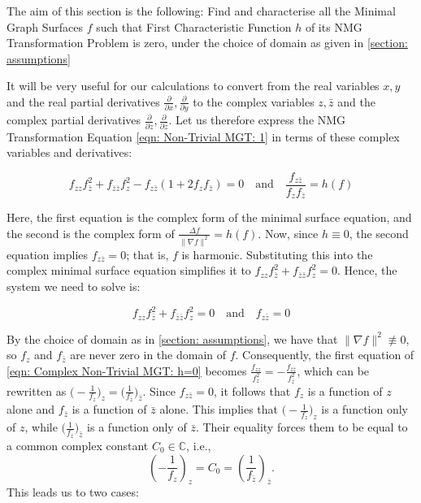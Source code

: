 \documentclass[12pt]{article}
\theoremstyle{plain}
\theoremstyle{definition}
\theoremstyle{remark}
\begin{document}
   The aim of this section is the following: Find and characterise all the Minimal Graph Surfaces \(f\) such that First Characteristic Function \(h\) of its NMG Transformation Problem is zero, under the choice of domain as given in \ref{section: assumptions}
   
   It will be very useful for our calculations to convert from the real variables \(x, y\) and the real partial derivatives \(\tfrac{\partial}{\partial x}, \tfrac{\partial}{\partial y}\) to the complex variables \(z, \bar{z}\) and the complex partial derivatives \(\tfrac{\partial}{\partial z}, \tfrac{\partial}{\partial \bar{z}}\). Let us therefore express the NMG Transformation Equation \ref{eqn: Non-Trivial MGT: 1} in terms of these complex variables and derivatives:
   
   \begin{equation}
   	\label{eqn: Complex Non-Trivial MGT: 2}
   	\boxed{f_{zz}f_{\bar{z}}^2 + f_{\bar{z}\bar{z}}f_{z}^2 - f_{z\bar{z}}(1 + 2f_z f_{\bar{z}}) = 0} \quad \text{and} \quad \boxed{\frac{f_{z\bar{z}}}{f_z f_{\bar{z}}} = h(f)}
   \end{equation}
   
   Here, the first equation is the complex form of the minimal surface equation, and the second is the complex form of \(\tfrac{\Delta f}{\|\nabla f\|^2} = h(f)\). Now, since \(h \equiv 0\), the second equation implies \(f_{z\bar{z}} = 0\); that is, \(f\) is harmonic. Substituting this into the complex minimal surface equation simplifies it to \(f_{zz} f_{\bar{z}}^2 + f_{\bar{z}\bar{z}} f_{z}^2 = 0\). Hence, the system we need to solve is:
   
   \begin{equation}
   	\label{eqn: Complex Non-Trivial MGT: h=0}
   	\boxed{f_{zz} f_{\bar{z}}^2 + f_{\bar{z}\bar{z}} f_{z}^2 = 0} \quad \text{and} \quad \boxed{f_{z\bar{z}} = 0}
   \end{equation}

   By the choice of domain as in \ref{section: assumptions}, we have that \(\|\nabla f\|^2 \not\equiv 0\), so \(f_z\) and \(f_{\bar{z}}\) are never zero in the domain of \(f\). Consequently, the first equation of \ref{eqn: Complex Non-Trivial MGT: h=0} becomes \(\frac{f_{zz}}{f_z^2} = -\frac{f_{\bar{z}\bar{z}}}{f_{\bar{z}}^2}\), which can be rewritten as \(\big(-\frac{1}{f_z}\big)_z = \big( \frac{1}{f_{\bar{z}}} \big)_{\bar{z}}\). Since \(f_{z\bar{z}} = 0\), it follows that \(f_z\) is a function of \(z\) alone and \(f_{\bar{z}}\) is a function of \(\bar{z}\) alone. This implies that \(\big( -\frac{1}{f_z} \big)_z\) is a function only of \(z\), while \(\big( \frac{1}{f_{\bar{z}}} \big)_{\bar{z}}\) is a function only of \(\bar{z}\). Their equality forces them to be equal to a common complex constant \(C_0 \in \mathbb{C}\), i.e.,
   \[
   \left( -\frac{1}{f_z} \right)_z = C_0 = \left( \frac{1}{f_{\bar{z}}} \right)_{\bar{z}}.
   \]
   This leads us to two cases:
   
\end{document}
